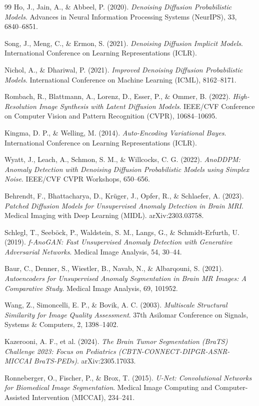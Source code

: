 \documentclass[12pt, a4paper]{article}
\begin{document}
\begin{thebibliography}{99}
    Ho, J., Jain, A., \& Abbeel, P. (2020).
    \textit{Denoising Diffusion Probabilistic Models}.
    Advances in Neural Information Processing Systems (NeurIPS), 33, 6840--6851.

    Song, J., Meng, C., \& Ermon, S. (2021).
    \textit{Denoising Diffusion Implicit Models}.
    International Conference on Learning Representations (ICLR).

    Nichol, A., \& Dhariwal, P. (2021).
    \textit{Improved Denoising Diffusion Probabilistic Models}.
    International Conference on Machine Learning (ICML), 8162--8171.

    Rombach, R., Blattmann, A., Lorenz, D., Esser, P., \& Ommer, B. (2022).
    \textit{High-Resolution Image Synthesis with Latent Diffusion Models}.
    IEEE/CVF Conference on Computer Vision and Pattern Recognition (CVPR), 10684--10695.

    Kingma, D. P., \& Welling, M. (2014).
    \textit{Auto-Encoding Variational Bayes}.
    International Conference on Learning Representations (ICLR).

    Wyatt, J., Leach, A., Schmon, S. M., \& Willcocks, C. G. (2022).
    \textit{AnoDDPM: Anomaly Detection with Denoising Diffusion Probabilistic Models using Simplex Noise}.
    IEEE/CVF CVPR Workshops, 650--656.

    Behrendt, F., Bhattacharya, D., Krüger, J., Opfer, R., \& Schlaefer, A. (2023).
    \textit{Patched Diffusion Models for Unsupervised Anomaly Detection in Brain MRI}.
    Medical Imaging with Deep Learning (MIDL). arXiv:2303.03758.

    Schlegl, T., Seeböck, P., Waldstein, S. M., Langs, G., \& Schmidt-Erfurth, U. (2019).
    \textit{f-AnoGAN: Fast Unsupervised Anomaly Detection with Generative Adversarial Networks}.
    Medical Image Analysis, 54, 30--44.

    Baur, C., Denner, S., Wiestler, B., Navab, N., \& Albarqouni, S. (2021).
    \textit{Autoencoders for Unsupervised Anomaly Segmentation in Brain MR Images: A Comparative Study}.
    Medical Image Analysis, 69, 101952.

    Wang, Z., Simoncelli, E. P., \& Bovik, A. C. (2003).
    \textit{Multiscale Structural Similarity for Image Quality Assessment}.
    37th Asilomar Conference on Signals, Systems \& Computers, 2, 1398--1402.

    Kazerooni, A. F., et al. (2024).
    \textit{The Brain Tumor Segmentation (BraTS) Challenge 2023: Focus on Pediatrics (CBTN-CONNECT-DIPGR-ASNR-MICCAI BraTS-PEDs)}.
    arXiv:2305.17033.

    Ronneberger, O., Fischer, P., \& Brox, T. (2015).
    \textit{U-Net: Convolutional Networks for Biomedical Image Segmentation}.
    Medical Image Computing and Computer-Assisted Intervention (MICCAI), 234--241.

\end{thebibliography}
\end{document}
